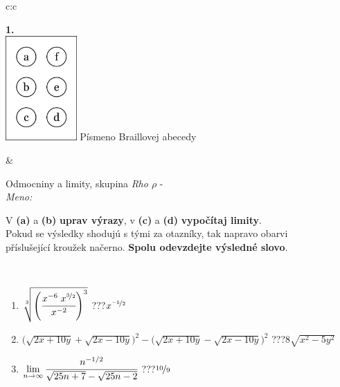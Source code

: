\documentclass[10pt]{report}
\begin{document}
\begin{tabular}{c:c}
\begin{minipage}[c][104.5mm][t]{0.5\linewidth}
\begin{center}
\begin{minipage}{0.20\linewidth}
\begin{center}
{\Huge\bfseries 1.} \\[2mm]
\includegraphics[height=40mm]{../images/braille.png}
{\small Písmeno Braillovej abecedy}
\end{center}
\end{minipage}
\end{center}
\end{minipage}
&
\begin{minipage}[c][104.5mm][t]{0.5\linewidth}
\begin{center}
\vspace{7mm}
{\huge Odmocniny a limity, skupina \textit{Rho $\rho$} -}\\[5mm]
\textit{Meno:}\phantom{xxxxxxxxxxxxxxxxxxxxxxxxxxxxxxxxxxxxxxxxxxxxxxxxxxxxxxxxxxxxxxxxx}\\[5mm]
\begin{minipage}{0.95\linewidth}
\begin{center}
V \textbf{(a)} a \textbf{(b)} \textbf{uprav výrazy}, v \textbf{(c)} a \textbf{(d)} \textbf{vypočítaj limity}.\\Pokud se výsledky shodujú s tými za otazníky, tak napravo obarvi\\příslušející kroužek načerno. \textbf{Spolu odevzdejte výsledné slovo}.
\end{center}
\end{minipage}
\\[1mm]
\begin{minipage}{0.79\linewidth}
\begin{center}
\begin{varwidth}{\linewidth}
\begin{enumerate}
\small
\item $\sqrt[3]{\left(\cfrac{x^{-6}\;x^{\nicefrac{3}{2}}}{x^{-2}}\right)^{3}}$\quad \dotfill\; ???\;\dotfill \quad $x^{\nicefrac{-5}{2}}$
\item {\footnotesize{\scriptsize$\big(\sqrt{2x+10y}+\sqrt{2x-10y}\big)^2-\big(\sqrt{2x+10y}-\sqrt{2x-10y}\big)^2$}\quad \dotfill\; ???\;\dotfill \quad $8\sqrt{x^2-5y^2}$}
\item $\lim\limits_{n\to\infty}\cfrac{n^{-1/2}}{\sqrt{25n+7}-\sqrt{25n-2}}$\quad \dotfill\; ???\;\dotfill \quad $\nicefrac{10}{9}$

\end{enumerate}
\end{varwidth}
\end{center}
\end{minipage}
\end{center}
\end{minipage}
\end{tabular}
\end{document}
